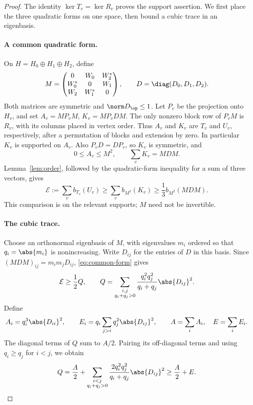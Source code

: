 \begin{proof}
The identity \(\ker T_v=\ker R_v\) proves the support assertion.
We first place the three quadratic forms on one space, then bound a
cubic trace in an eigenbasis.

\paragraph{A common quadratic form.}
On \(H=H_0\oplus H_1\oplus H_2\), define
\[
 M=\begin{pmatrix}
      0&W_0&W_2^*\\
      W_0^*&0&W_1\\
      W_2&W_1^*&0
    \end{pmatrix},
 \qquad D=\diag(D_0,D_1,D_2).
\]
Both matrices are symmetric and \(\norm D_{\op}\le1\).
Let \(P_v\) be the projection onto \(H_v\), and set
\(A_v=MP_vM\), \(K_v=MP_vDM\).
The only nonzero block row of \(P_vM\) is \(R_v\), with its columns
placed in vertex order. Thus \(A_v\) and \(K_v\) are \(T_v\) and
\(U_v\), respectively, after a permutation of blocks and extension
by zero. In particular \(K_v\) is supported on \(A_v\).
Also \(P_vD=DP_v\), so \(K_v\) is symmetric, and
\[
 0\le A_v\le M^2,\qquad \sum_vK_v=MDM.
\]
Lemma~\ref{lem:order}, followed by the quadratic-form inequality for
a sum of three vectors, gives
\begin{equation}\label{eq:common-form}
 \mathcal E:=\sum_v b_{T_v}(U_v)
 \ge\sum_v b_{M^2}(K_v)
 \ge\frac13b_{M^2}(MDM).
\end{equation}
This comparison is on the relevant supports; \(M\) need not be
invertible.

\paragraph{The cubic trace.}
Choose an orthonormal eigenbasis of \(M\), with eigenvalues \(m_i\)
ordered so that \(q_i=\abs{m_i}\) is nonincreasing. Write \(D_{ij}\)
for the entries of \(D\) in this basis. Since
\((MDM)_{ij}=m_im_jD_{ij}\), \eqref{eq:common-form} gives
\begin{equation}\label{eq:Q}
 \mathcal E\ge\frac12 Q,\qquad
 Q=\sum_{\substack{i,j\\q_i+q_j>0}}
          \frac{q_i^2q_j^2}{q_i+q_j}\abs{D_{ij}}^2.
\end{equation}
Define
\[
 A_i=q_i^3\abs{D_{ii}}^2,\qquad
 E_i=q_i\sum_{j>i}q_j^2\abs{D_{ij}}^2,\qquad
 A=\sum_iA_i,\quad E=\sum_iE_i.
\]
The diagonal terms of \(Q\) sum to \(A/2\). Pairing its off-diagonal
terms and using \(q_i\ge q_j\) for \(i<j\), we obtain
\begin{equation}\label{eq:AE}
 Q=\frac A2+
 \sum_{\substack{i<j\\q_i+q_j>0}}
        \frac{2q_i^2q_j^2}{q_i+q_j}\abs{D_{ij}}^2
 \ge \frac A2+E.
\end{equation}


\end{proof}
